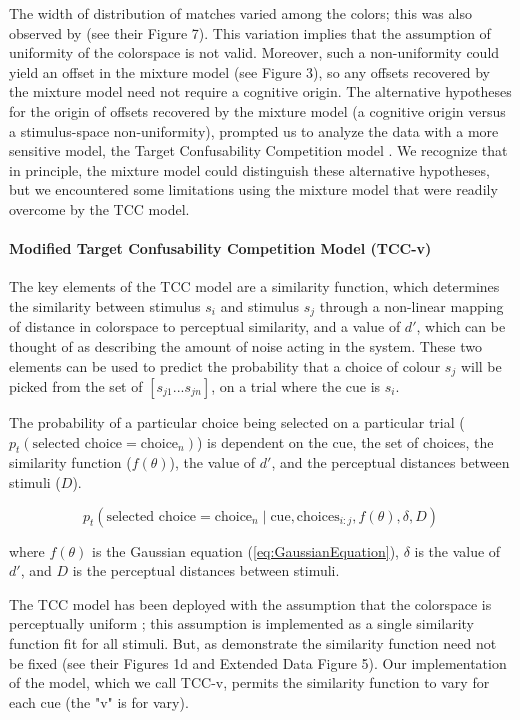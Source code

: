 \documentclass[9pt,biorxiv,lineno,onehalfspacing]{lapreprint}
\begin{document}
\begin{refsection}
The width of distribution of matches varied among the colors; this was also observed by \citet{bae_why_2015} (see their Figure 7). 
This variation implies that the assumption of uniformity of the colorspace is not valid. 
Moreover, such a non-uniformity could yield an offset in the mixture model (see Figure 3), so any offsets recovered by the mixture model need not require a cognitive origin.  
The alternative hypotheses for the origin of offsets recovered by the mixture model (a cognitive origin versus a stimulus-space non-uniformity), prompted us to analyze the data with a more sensitive model, the Target Confusability Competition model \citep{schurgin_psychophysical_2020}.
We recognize that in principle, the mixture model could distinguish these alternative hypotheses, but we encountered some limitations using the mixture model that were readily overcome by the TCC model. 

\paragraph{Modified Target Confusability Competition Model (TCC-v)}\label{para:TCC}

The key elements of the TCC model are a similarity function, which determines the similarity between stimulus $s_i$ and stimulus $s_j$ through a non-linear mapping of distance in colorspace to perceptual similarity, and a value of $d'$, which can be thought of as describing the amount of noise acting in the system. 
These two elements can be used to predict the probability that a choice of colour $s_j$ will be picked from the set of $\left[s_{j1}...s_{jn}\right]$, on a trial where the cue is $s_i$. 

The probability of a particular choice being selected on a particular trial ($p_t(\text{selected choice} = \text{choice}_n)$) is dependent on the cue, the set of choices, the similarity function ($f(\theta)$), the value of $d'$, and the perceptual distances between stimuli ($D$).

\begin{equation} \label{eq:pt}
    p_t\left(\text{selected choice} = \text{choice}_n \mid \text{cue},\text{choices}_{i:j}, f(\theta), \delta, D\right)
\end{equation}

where $f(\theta)$ is the Gaussian equation (\autoref{eq:GaussianEquation}), $\delta$ is the value of $d'$, and $D$ is the perceptual distances between stimuli.

The TCC model has been deployed with the assumption that the colorspace is perceptually uniform \citep{schurgin_psychophysical_2020}; this assumption is implemented as a single similarity function fit for all stimuli. 
But, as \citet{schurgin_psychophysical_2020} demonstrate the similarity function need not be fixed (see their Figures 1d and Extended Data Figure 5). 
Our implementation of the model, which we call TCC-v, permits the similarity function to vary for each cue (the "v" is for vary). 


\end{refsection}
\end{document}
